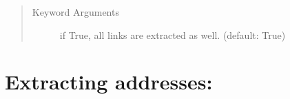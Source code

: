 \documentclass[letterpaper,10pt,english]{sphinxmanual}
\begin{document}
\begin{fulllineitems}
\begin{fulllineitems}
\begin{quote}
\begin{description}
\item[{Keyword Arguments}] \leavevmode
{} \textendash{} if True, all links are extracted as well. (default: True)

\end{description}\end{quote}

\end{fulllineitems}


\end{fulllineitems}



\section{Extracting addresses:}
\label{\detokenize{api:extracting-addresses}}\label{\detokenize{api:module-impressum}}
\end{document}
